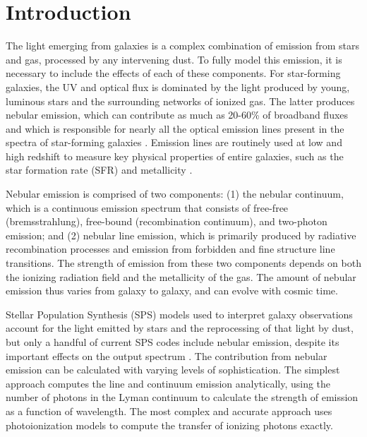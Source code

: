 \documentclass[linenumbers, trackchanges, tighten]{aastex61}%
\begin{document}
\section{Introduction} \label{sec:introduction}

The light emerging from galaxies is a complex combination of emission from stars and gas, processed by any intervening dust. To fully model this emission, it is necessary to include the effects of each of these components. For star-forming galaxies, the UV and optical flux is dominated by the light produced by young, luminous stars and the surrounding networks of ionized gas. The latter produces nebular emission, which can contribute as much as 20-60\% of broadband fluxes and which is responsible for nearly all the optical emission lines present in the spectra of star-forming galaxies \citep{Anders03, Reines10}. Emission lines are routinely used at low and high redshift to measure key physical properties of entire galaxies, such as the star formation rate (SFR) and metallicity \citep[e.g.,][]{Tremonti04, Kewley08}.

Nebular emission is comprised of two components: (1) the nebular continuum, which is a continuous emission spectrum that consists of free-free (bremsstrahlung), free-bound (recombination continuum), and two-photon emission; and (2) nebular line emission, which is primarily produced by radiative recombination processes and emission from forbidden and fine structure line transitions. The strength of emission from these two components depends on both the ionizing radiation field and the metallicity of the gas. The amount of nebular emission thus varies from galaxy to galaxy, and can evolve with cosmic time.

Stellar Population Synthesis (SPS) models used to interpret galaxy observations account for the light emitted by stars and the reprocessing of that light by dust, but only a handful of current SPS codes include nebular emission, despite its important effects on the output spectrum \citep[see reviews in][]{Walcher11, Conroy13}. The contribution from nebular emission can be calculated with varying levels of sophistication. The simplest approach computes the line and continuum emission analytically, using the number of photons in the Lyman continuum to calculate the strength of emission as a function of wavelength. The most complex and accurate approach uses photoionization models to compute the transfer of ionizing photons exactly.
\end{document}
